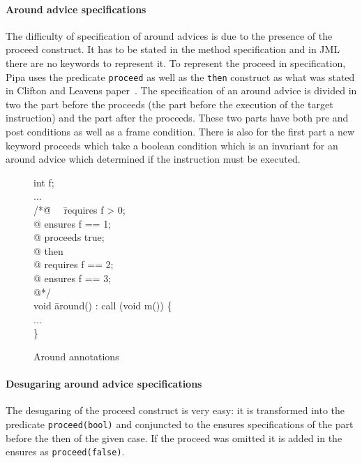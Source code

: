 \paragraph{Around advice specifications} The difficulty of specification of around advices is due to the presence
of the proceed construct. It has to be stated in the method specification and in JML there are no keywords to
represent it. To represent the proceed in specification, Pipa uses the predicate {\tt proceed}
as well as the {\tt then} construct as what was stated in Clifton and Leavens paper~\cite{clifton02spectators}.
The specification of an around advice is divided in two the part before the proceeds (the part before the 
execution of the target instruction) and the part after the proceeds. These two parts have both pre and post 
conditions as well as a frame condition. There is also for the first part a new keyword proceeds which take a 
boolean condition which is an invariant for an around advice which determined if the instruction must be executed.

\begin{figure}
\begin{center}\begin{minipage}{3cm}\bcode
int f;\\
...\\
/*\=@ \ \ \=requires f > 0;\+ \\
@ \>ensures f == 1;\\
@ \>proceeds true;\\
@ then\\
@ \> requires f == 2;\\
@ \> ensures f == 3;\\
@*/\-\\
void \= around() : call (void m()) \{\\
\>...\\
\} \ecode\end{minipage}\end{center}
\caption{Around annotations}
\label{arround_annot}
\end{figure}

\paragraph{Desugaring around advice specifications}
The desugaring of the proceed construct is very easy: it is transformed into the predicate {\tt proceed(bool)} 
and conjuncted to the ensures specifications of the part before the then of the given case. 
If the proceed was omitted it is added in the ensures as {\tt proceed(false)}.

